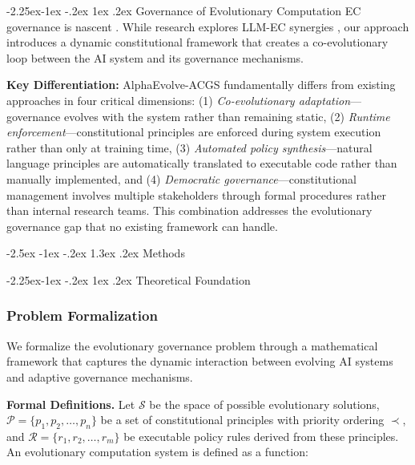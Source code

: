 \documentclass[manuscript,screen,review,anonymous,9pt]{acmart}
\makeatletter
\renewcommand\section{\@startsection{section}{1}{\z@}%
  {-2.5ex \@plus -1ex \@minus -.2ex}%
  {1.3ex \@plus.2ex}%
  {\normalfont\Large\bfseries}}
\renewcommand\subsection{\@startsection{subsection}{2}{\z@}%
  {-2.25ex\@plus -1ex \@minus -.2ex}%
  {1ex \@plus .2ex}%
  {\normalfont\large\bfseries}}
\makeatother
\begin{document}
\subsection{Governance of Evolutionary Computation}
EC governance is nascent \cite{Chauhan2025ECLLMSurvey}. While research explores LLM-EC synergies \cite{Nordin2024LLMGP}, our approach introduces a dynamic constitutional framework that creates a co-evolutionary loop between the AI system and its governance mechanisms.

\textbf{Key Differentiation:} AlphaEvolve-ACGS fundamentally differs from existing approaches in four critical dimensions: (1) \textit{Co-evolutionary adaptation}---governance evolves with the system rather than remaining static, (2) \textit{Runtime enforcement}---constitutional principles are enforced during system execution rather than only at training time, (3) \textit{Automated policy synthesis}---natural language principles are automatically translated to executable code rather than manually implemented, and (4) \textit{Democratic governance}---constitutional management involves multiple stakeholders through formal procedures rather than internal research teams. This combination addresses the evolutionary governance gap that no existing framework can handle.


\section{Methods}
\label{sec:methods}

\subsection{Theoretical Foundation}
\label{subsec:theoretical_foundation}

\subsubsection{Problem Formalization}
\label{subsubsec:problem_formalization}

We formalize the evolutionary governance problem through a mathematical framework that captures the dynamic interaction between evolving AI systems and adaptive governance mechanisms.

\textbf{Formal Definitions.} Let $\mathcal{S}$ be the space of possible evolutionary solutions, $\mathcal{P} = \{p_1, p_2, \ldots, p_n\}$ be a set of constitutional principles with priority ordering $\prec$, and $\mathcal{R} = \{r_1, r_2, \ldots, r_m\}$ be executable policy rules derived from these principles. An evolutionary computation system is defined as a function:
\end{document}
